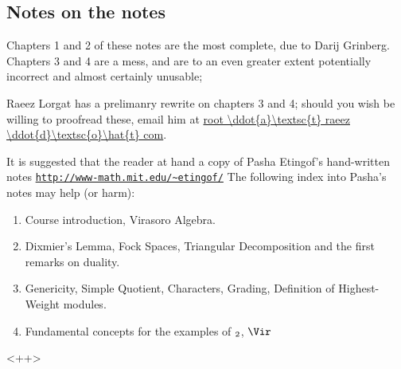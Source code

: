 \documentclass[etingof-lie.tex]{subfiles}
\begin{document}
\subsection{Notes on the notes}

Chapters 1 and 2 of these notes are the most complete, due to Darij Grinberg.
Chapters 3 and 4 are a mess, and are to an even greater extent potentially
incorrect and almost certainly unusable;

Raeez Lorgat has a prelimanry rewrite on chapters 3 and 4; should you wish be
willing to proofread these, email him at \url{root \ddot{a}\textsc{t} raeez
\ddot{d}\textsc{o}\hat{t} com}.

It is suggested that the reader at hand a copy of Pasha Etingof's
hand-written notes \newline\texttt{\url{http://www-math.mit.edu/~etingof/}}
The following index into Pasha's notes may help (or harm):

\nc{}

\begin{enumerate}
  \item Course introduction, Virasoro Algebra.
  \item Dixmier's Lemma, Fock Spaces,
    Triangular Decomposition and the first remarks on duality.
  \item Genericity, Simple Quotient,
    Characters, Grading, Definition of Highest-Weight modules.
  \item Fundamental concepts for the examples of $\sl_2$, $\Vir$
\end{enumerate}<++>
\end{document}
